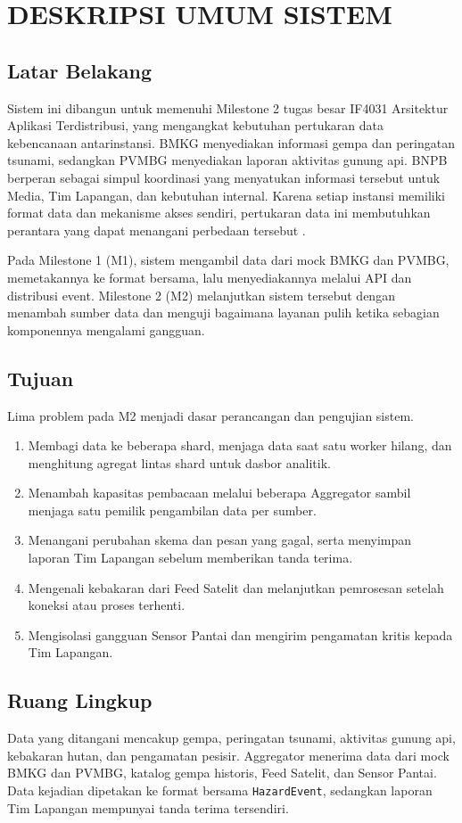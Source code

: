 \chapter{DESKRIPSI UMUM SISTEM}

\section{Latar Belakang}
Sistem ini dibangun untuk memenuhi Milestone 2 tugas besar IF4031 Arsitektur Aplikasi Terdistribusi, yang mengangkat kebutuhan pertukaran data kebencanaan antarinstansi. BMKG menyediakan informasi gempa dan peringatan tsunami, sedangkan PVMBG menyediakan laporan aktivitas gunung api. BNPB berperan sebagai simpul koordinasi yang menyatukan informasi tersebut untuk Media, Tim Lapangan, dan kebutuhan internal. Karena setiap instansi memiliki format data dan mekanisme akses sendiri, pertukaran data ini membutuhkan perantara yang dapat menangani perbedaan tersebut \cite{spec}.

Pada Milestone 1 (M1), sistem mengambil data dari mock BMKG dan PVMBG, memetakannya ke format bersama, lalu menyediakannya melalui API dan distribusi event. Milestone 2 (M2) melanjutkan sistem tersebut dengan menambah sumber data dan menguji bagaimana layanan pulih ketika sebagian komponennya mengalami gangguan.

\section{Tujuan}
Lima problem pada M2 menjadi dasar perancangan dan pengujian sistem.
\begin{enumerate}
  \item Membagi data ke beberapa shard, menjaga data saat satu worker hilang, dan menghitung agregat lintas shard untuk dasbor analitik.
  \item Menambah kapasitas pembacaan melalui beberapa Aggregator sambil menjaga satu pemilik pengambilan data per sumber.
  \item Menangani perubahan skema dan pesan yang gagal, serta menyimpan laporan Tim Lapangan sebelum memberikan tanda terima.
  \item Mengenali kebakaran dari Feed Satelit dan melanjutkan pemrosesan setelah koneksi atau proses terhenti.
  \item Mengisolasi gangguan Sensor Pantai dan mengirim pengamatan kritis kepada Tim Lapangan.
\end{enumerate}

\section{Ruang Lingkup}
Data yang ditangani mencakup gempa, peringatan tsunami, aktivitas gunung api, kebakaran hutan, dan pengamatan pesisir. Aggregator menerima data dari mock BMKG dan PVMBG, katalog gempa historis, Feed Satelit, dan Sensor Pantai. Data kejadian dipetakan ke format bersama \texttt{HazardEvent}, sedangkan laporan Tim Lapangan mempunyai tanda terima tersendiri.

